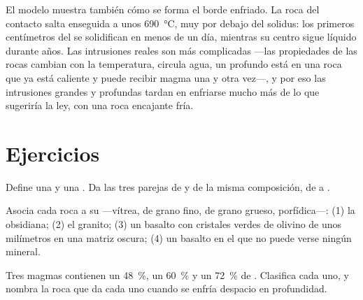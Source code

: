 El modelo muestra también cómo se forma el borde enfriado. La roca del
contacto salta enseguida a unos \qty{690}{\degreeCelsius}, muy por debajo del
solidus: los primeros centímetros del  se solidifican en menos de un
día, mientras su centro sigue líquido durante años. Las intrusiones reales son
más complicadas ---las propiedades de las rocas cambian con la temperatura,
circula agua, un  profundo está en una roca que ya está caliente y
puede recibir magma una y otra vez---, y por eso las intrusiones grandes y
profundas tardan en enfriarse mucho más de lo que sugeriría la ley, con una
roca encajante fría.

\section{Ejercicios}

\begin{exercise}[$\star$]\label{exo:g11:igneous-rocks:1}
Define una  y una . Da las tres parejas de  y  de la misma composición, de  a .
\end{exercise}

\begin{exercise}[$\star$]\label{exo:g11:igneous-rocks:2}
Asocia cada roca a su  ---vítrea, de grano fino, de grano grueso,
porfídica---: (1) la obsidiana; (2) el granito; (3) un basalto con cristales
verdes de olivino de unos milímetros en una matriz oscura; (4) un basalto en
el que no puede verse ningún mineral.
\end{exercise}

\begin{exercise}[$\star$]\label{exo:g11:igneous-rocks:3}
Tres magmas contienen un \qty{48}{\percent}, un \qty{60}{\percent} y un
\qty{72}{\percent} de . Clasifica cada uno, y nombra la roca que da
cada uno cuando se enfría despacio en profundidad.
\end{exercise}

